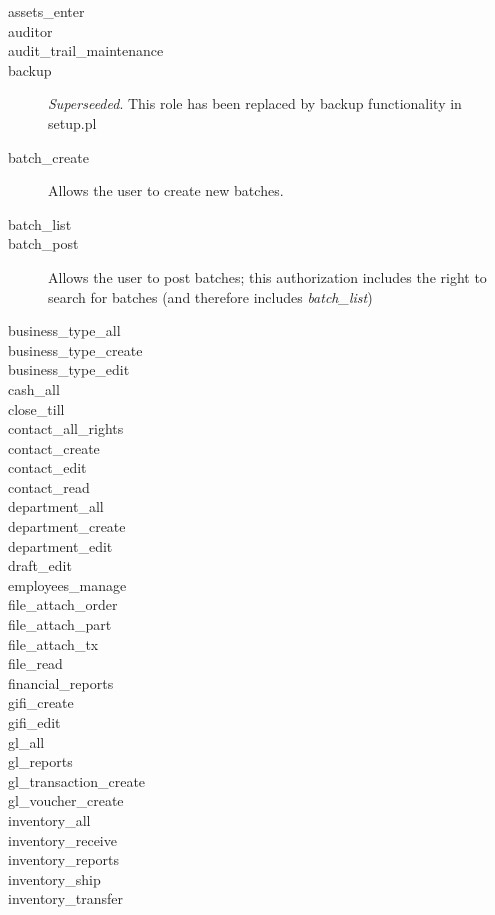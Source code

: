\begin{description}
\item [assets\_enter]
\item [auditor]
\item [audit\_trail\_maintenance]
\item [backup] \emph{Superseeded}. This role has been replaced by backup functionality
   in setup.pl
\item [batch\_create] Allows the user to create new batches.
\item [batch\_list]
\item [batch\_post] Allows the user to post batches; this authorization includes the
   right to search for batches (and therefore includes \emph{batch\_list})
\item [business\_type\_all]
\item [business\_type\_create]
\item [business\_type\_edit]
\item [cash\_all]
\item [close\_till]
\item [contact\_all\_rights]
\item [contact\_create]
\item [contact\_edit]
\item [contact\_read]
\item [department\_all]
\item [department\_create]
\item [department\_edit]
\item [draft\_edit]
\item [employees\_manage]
\item [file\_attach\_order]
\item [file\_attach\_part]
\item [file\_attach\_tx]
\item [file\_read]
\item [financial\_reports]
\item [gifi\_create]
\item [gifi\_edit]
\item [gl\_all]
\item [gl\_reports]
\item [gl\_transaction\_create]
\item [gl\_voucher\_create]
\item [inventory\_all]
\item [inventory\_receive]
\item [inventory\_reports]
\item [inventory\_ship]
\item [inventory\_transfer]

\end{description}
